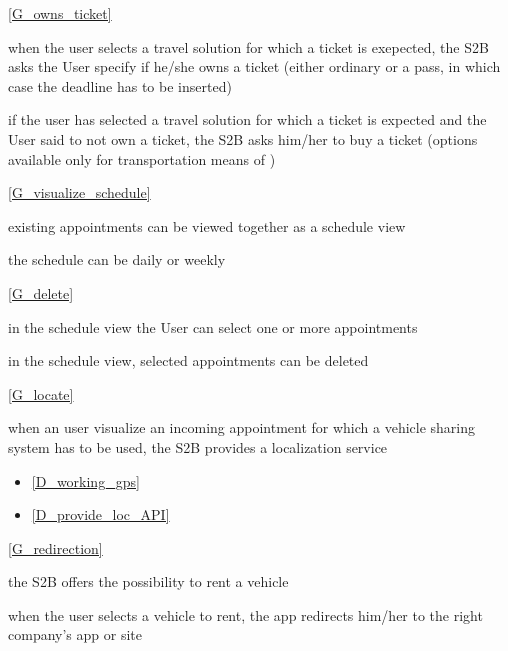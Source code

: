 	\noindent\ref{G_owns_ticket}
	\begin{enumerate}[resume, label={[R\arabic*]}]
	\item when the user selects a travel solution for which a ticket is exepected, the S2B asks the User specify if he/she owns a ticket (either ordinary or a pass, in which case the deadline has to be inserted)
	\item if the user has selected a travel solution for which a ticket is expected and the User said to not own a ticket, the S2B asks him/her to buy a ticket (options available only for transportation means of )
	\end{enumerate}
	
	\noindent\ref{G_visualize_schedule}
	\begin{enumerate}[resume, label={[R\arabic*]}]
	\item \label{R_schedule_view} existing appointments can be viewed together as a schedule view
	\item \label{R_daily_weekly} the schedule can be daily or weekly
	\end{enumerate}
	
	\noindent\ref{G_delete}
	\begin{enumerate}[resume, label={[R\arabic*]}]
		\item \label{R_can_select} in the schedule view the User can select one or more appointments
		\item \label{R_delete_selected} in the schedule view, selected appointments can be deleted
	\end{enumerate}
	
	\noindent\ref{G_locate}
	\begin{enumerate}[resume, label={[R\arabic*]}]
	\item \label{R_provide_loc_service} when an user visualize an incoming appointment for which a vehicle sharing system has to be used, the S2B provides a localization service
	\end{enumerate}
	\begin{itemize}
		\item[] \ref{D_working_gps}
		\item[] \ref{D_provide_loc_API}
	\end{itemize}
	
	\noindent\ref{G_redirection}
	\begin{enumerate}[resume, label={[R\arabic*]}]
		\item \label{R_rent_vehicle} the S2B offers the possibility to rent a vehicle
		\item \label{R_redirects} when the user selects a vehicle to rent, the app redirects him/her to the right company's app or site
	\end{enumerate}
	
